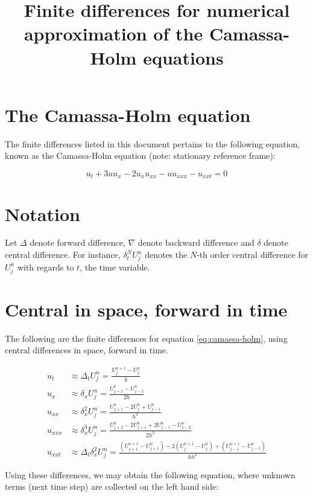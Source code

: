 \documentclass[fleqn]{article}
\begin{document}
\title{Finite differences for numerical approximation of the Camassa-Holm equations}
\maketitle

\section*{The Camassa-Holm equation}
The finite differences listed in this document pertains to the following equation, known as the Camassa-Holm equation (note: stationary reference frame):

\begin{equation}
\label{eq:camassa-holm}
u_t + 3uu_x - 2u_xu_{xx} - uu_{xxx} - u_{xxt} = 0
\end{equation}

\section*{Notation}
Let $\Delta$ denote forward difference, $\nabla$ denote backward difference and $\delta$ denote central difference. For instance, $\delta_t^N U_j^n$ denotes the $N$-th order central difference for $U_j^n$ with regards to $t$, the time variable.

\section*{Central in space, forward in time}
The following are the finite differences for equation \eqref{eq:camassa-holm}, using central differences in space, forward in time.

\begin{align}
u_t &\approx \Delta_t U_j^n = \frac{U_{j}^{n+1} - U_{j}^{n}}{k} \\
u_x &\approx \delta_x U_j^n = \frac{U_{j+1}^n - U_{j-1}^n}{2h} \\
u_{xx} &\approx \delta_x^2 U_j^n = \frac{U_{j+1}^n - 2U_j^n + U_{j-1}^n}{h^2} \\
u_{xxx} &\approx \delta_x^3 U_j^n = \frac{U_{j+2}^n - 2U_{j+1}^n + 2U_{j-1}^n - U_{j-2}^n}{2h^3} \\
u_{xxt} &\approx \Delta_t \delta_x^2 U_j^n = \frac{(U_{j+1}^{n+1} - U_{j+1}^n) - 2(U_j^{n+1} - U_j^n) + (U_{j-1}^{n+1} - U_{j-1}^n)}{kh^2}
\end{align}

Using these differences, we may obtain the following equation, where unknown terms (next time step) are collected on the left hand side:
\end{document}
